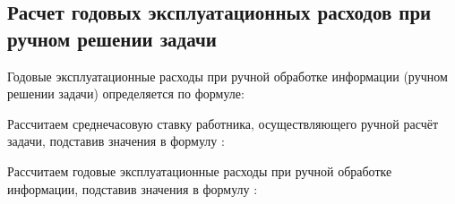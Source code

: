 \subsection{Расчет годовых эксплуатационных расходов при ручном решении задачи}
\label{sec:economics:manualexpenses}

Годовые эксплуатационные расходы при ручной обработке информации (ручном решении задачи) определяется по формуле:
\manualExpensesEquation

Рассчитаем среднечасовую ставку работника, осуществляющего ручной расчёт задачи, подставив значения в формулу :
\monkerHourRateFormulaApplied

Рассчитаем годовые эксплуатационные расходы при ручной обработке информации, подставив значения в формулу :
\manualExpensesFormulaApplied